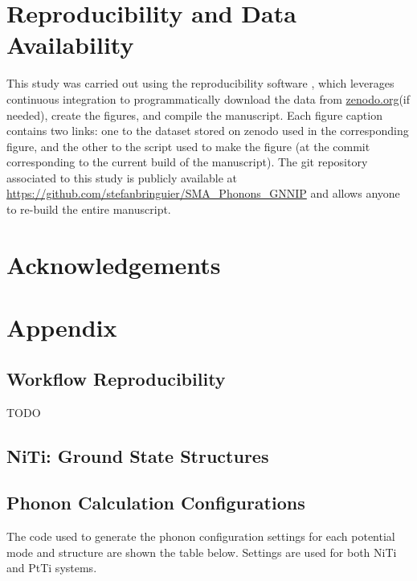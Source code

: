 \documentclass[preprint,colorlinks=true,linkcolor=black,citecolor=black]{elsarticle}
\begin{document}
\section*{Reproducibility and Data Availability}
This study was carried out using the reproducibility software \href{https://github.com/showyourwork/showyourwork}{\showyourwork}\cite{Luger2021}, which leverages continuous integration to programmatically download the data from \href{https://zenodo.org/}{zenodo.org}(if needed), create the figures, and compile the manuscript. Each figure caption contains two links: one to the dataset stored on zenodo used in the corresponding figure, and the other to the script used to make the figure (at the commit corresponding to the current build of the manuscript). The git repository associated to this study is publicly available at \url{https://github.com/stefanbringuier/SMA_Phonons_GNNIP} and allows anyone to re-build the entire manuscript.\par

\section*{Acknowledgements}

\newpage
\appendix
\section{Appendix}
\subsection{Workflow Reproducibility}
\label{sec:appx_reproduce}

TODO

\subsection{NiTi: Ground State Structures}
\label{sec:opt_structures}


\subsection{Phonon Calculation Configurations}
\label{sec:phonon_calc_config}

The code used to generate the phonon configuration settings for each potential mode and structure are shown the table below. Settings are used for both NiTi and PtTi systems.
\end{document}

